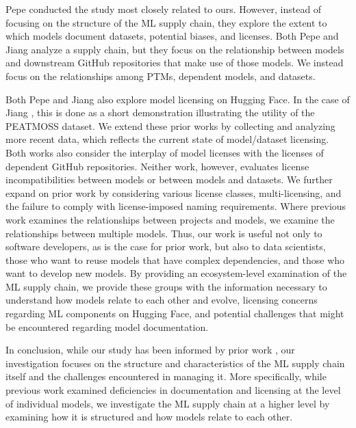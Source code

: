 Pepe \etal \cite{pepe2024hugging} conducted the study most closely related to ours. However, instead of focusing on the structure of the ML supply chain, they explore the extent to which models document datasets, potential biases, and licenses.  Both Pepe \etal \cite{pepe2024hugging} and Jiang \etal \cite{jiang2024peatmoss} analyze a supply chain, but they focus on the relationship between models and downstream GitHub repositories that make use of those models.  We instead focus on the relationships among PTMs, dependent models, and datasets.

Both Pepe \etal \cite{pepe2024hugging} and Jiang \etal \cite{jiang2024peatmoss} also explore model licensing on Hugging Face.  In the case of Jiang \etal \cite{jiang2024peatmoss}, this is done as a short demonstration illustrating the utility of the PEATMOSS dataset.  %
We extend these prior works by collecting and analyzing more recent data, which reflects the current state of model/dataset licensing.  %
Both works also consider the interplay of model licenses with the licenses of dependent GitHub repositories.  Neither work, however, evaluates license incompatibilities between models or between models and datasets.  We further expand on prior work by considering various license classes, multi-licensing, and the failure to comply with license-imposed naming requirements. Where previous work examines the relationships between projects and models, we examine the relationships between multiple models. Thus, our work is useful not only to software developers, as is the case for prior work, but also to data scientists, those who want to reuse models that have complex dependencies, and those who want to develop new models. By providing an ecosystem-level examination of the ML supply chain, we provide these groups with the information necessary to understand how models relate to each other and evolve, licensing concerns regarding ML components on Hugging Face, and potential challenges that might be encountered regarding model documentation. %



In conclusion, while our study %
has been informed by prior work \cite{castano2024lessons,yang2024navigating,jiang2024naming,jiang2023ptmtorrent,oreamuno2024state,Jiang2023AnES,pepe2024hugging,taraghi2024deep,jiang2023peatmoss}, %
our investigation focuses on the structure and characteristics of the ML supply chain itself and the challenges encountered in managing it. More specifically, while previous work examined deficiencies in documentation and licensing at the level of individual models, we investigate the ML supply chain at a higher level by examining how it is structured and how models relate to each other. %





